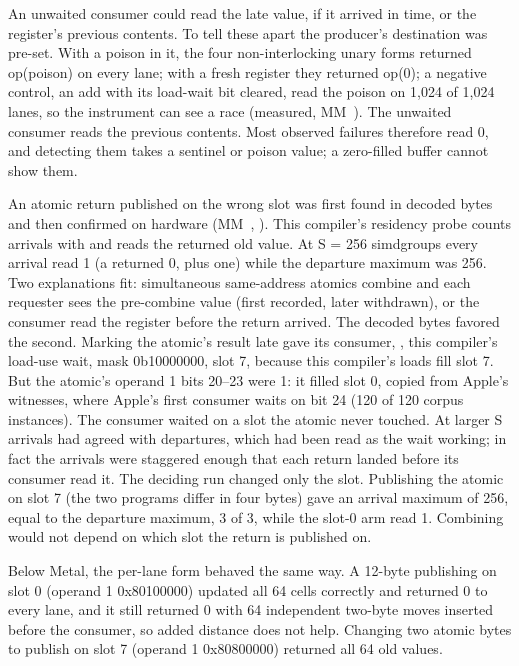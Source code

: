 An unwaited consumer could read the late value, if it arrived in time, or the register's previous contents. To tell these apart the producer's destination was pre-set. With a poison in it, the
four non-interlocking unary forms returned op(poison) on every lane; with a fresh register they returned op(0); a
negative control, an add with its load-wait bit cleared, read the poison on 1,024 of 1,024 lanes, so the instrument can
see a race (measured, MM~). The unwaited consumer reads the previous contents. Most observed failures
therefore read 0, and detecting them takes a sentinel or poison value; a zero-filled buffer cannot show them.

An atomic return published on the wrong slot was first found in decoded bytes and then confirmed on hardware
(MM~, ). This compiler's residency probe counts arrivals with  and reads the returned old value. At S = 256 simdgroups every arrival read 1 (a returned 0, plus
one) while the departure maximum was 256. Two explanations fit: simultaneous same-address atomics combine and each requester sees the pre-combine
value (first recorded, later withdrawn), or the consumer read the register before the return arrived. The decoded bytes favored the second. Marking the atomic's result late
gave its consumer, , this compiler's load-use wait, mask 0b10000000, slot 7, because this
compiler's loads fill slot 7. But the atomic's operand 1 bits 20--23 were 1: it filled slot 0, copied from Apple's
witnesses, where Apple's first consumer waits on bit 24 (120 of 120 corpus instances). The consumer waited on a slot the
atomic never touched. At larger S arrivals had agreed with departures, which had been read as the wait working; in fact
the arrivals were staggered enough that each return landed before its consumer read it. The deciding run changed only the slot. Publishing the atomic on slot 7
(the two programs differ in four bytes) gave an arrival maximum of 256, equal to the departure maximum, 3 of 3, while the
slot-0 arm read 1. Combining would not depend on which slot the return is published on.

Below Metal, the per-lane form behaved the same way. A 12-byte 
publishing on slot 0 (operand 1 0x80100000) updated all 64 cells correctly and returned 0 to every lane, and it still
returned 0 with 64 independent two-byte moves inserted before the consumer, so added distance does not help. Changing two atomic bytes to publish on slot 7 (operand 1
0x80800000) returned all 64 old values.

